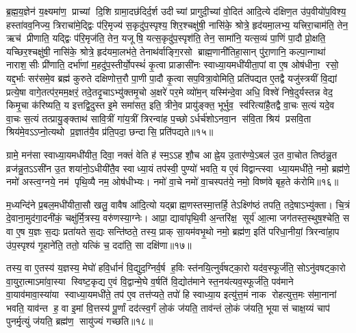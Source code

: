 ब्र॒ह्म॒य॒ज्ञेन॑ य॒क्ष्यमा॑ण॒ प्राच्यां दि॒शि ग्रामा॒दछ॑दिर्द॒र्\mbox{}श उदीच्यां प्रागुदी॒च्यां वो॒दित॑ आदि॒त्ये द॑क्षिण॒त उ॑प॒वीयो॑प॒विश्य॒ हस्ता॑वव॒निज्य॒ त्रिराचा॑मे॒द्द्विः प॑रि॒मृज्य॑ स॒कृदु॑प॒स्पृश्य॒ शिर॒श्चक्षु॑षी॒ नासि॑के॒ श्रोत्रे॒ हृद॑यमा॒लभ्य॒ यत्त्रिरा॒चाम॑ति॒ तेन॒ ऋच॑ प्रीणाति॒ यद्द्विः प॑रि॒मृज॑ति॒ तेन॒ यजूषि॒ यत्स॒कृदु॑प॒स्पृश॑ति॒ तेन॒ सामा॑नि॒ यत्स॒व्यं पा॒णिं पा॒दौ प्रो॒क्षति॒ यच्छिर॒श्चक्षु॑षी॒ नासि॑के॒ श्रोत्रे॒ हृद॑यमा॒लभ॑ते॒ तेनाथ॑र्वाङ्गि॒रसो ब्राह्म॒णानी॑तिहा॒सान् पु॑रा॒णानि॒ कल्पा॒न्गाथा॑ नाराश॒सीः प्री॑णाति॒ दर्भा॑णां म॒हदु॑प॒स्तीर्यो॒पस्थं॑ कृ॒त्वा प्राङासी॑नः स्वाध्या॒यमधी॑यीता॒पां वा ए॒ष ओष॑धीना॒ रसो॒ यद्द॒र्भाः सर॑समे॒व ब्रह्म॑ कुरुते दक्षिणोत्त॒रौ पा॒णी पा॒दौ कृ॒त्वा सप॒वित्रा॒वोमिति॒ प्रति॑पद्यत ए॒तद्वै यजु॑स्त्रयीं वि॒द्यां प्रत्ये॒षा वागे॒तत्प॑र॒मम॒क्षरं॒ तदे॒तदृ॒चाऽभ्यु॑क्तमृ॒चो अ॒क्षरे॑ पर॒मे व्यो॑म॒न् यस्मि॑न्दे॒वा अधि॒ विश्वे॑ निषे॒दुर्यस्तन्न वेद॒ किमृ॒चा क॑रिष्यति॒ य इत्तद्वि॒दुस्त इ॒मे समा॑सत॒ इति॒ त्रीने॒व प्रायु॑ङ्क्त॒ भूर्भुव॒ स्व॑रित्या॑है॒तद्वै वा॒चः स॒त्यं यदे॒व वा॒चः स॒त्यं तत्प्रायु॒ङ्क्ताथ॑ सावि॒त्रीं गा॑य॒त्रीं त्रिरन्वा॑ह प॒च्छोऽर्धर्च॑शोऽनवा॒न स॑वि॒ता श्रिय॑ प्रसवि॒ता श्रिय॑मे॒वऽऽप्नो॒त्यथो प्र॒ज्ञात॑यै॒व प्र॑ति॒पदा॒ छन्दासि॒ प्रति॑पद्यते॥१५॥\anuvakamend


ग्रामे॒ मन॑सा स्वाध्या॒यमधी॑यीत॒ दिवा॒ नक्तं॑ वेति ह॑ स्म॒ऽऽह शौ॒च आह्ने॒य उ॒तार॑ण्ये॒ऽबल॑ उ॒त वा॒चोत तिष्ठ॑न्नु॒त व्रज॑न्नु॒तऽऽसी॑न उ॒त शया॑नो॒ऽधीयी॑तै॒व स्वाध्या॒यं तप॑स्वी॒ पुण्यो॑ भवति॒ य ए॒वं विद्वान्त्स्वाध्या॒यमधी॑ते॒ नमो॒ ब्रह्म॑णे॒ नमो॑ अस्त्व॒ग्नये॒ नम॑ पृथि॒व्यै नम॒ ओष॑धीभ्यः। नमो॑ वा॒चे नमो॑ वा॒चस्पत॑ये॒ नमो॒ विष्ण॑वे बृह॒ते क॑रोमि॥१६॥
\anuvakamend


म॒ध्यन्दि॑ने प्र॒बल॒मधी॑यीता॒सौ खलु॒ वावैष आ॑दि॒त्यो यद्ब्राह्म॒ण\-स्तस्मा॒त्तर्\mbox{}हि॒ तेऽक्ष्णि॑ष्ठं तपति॒ तदे॒षाऽभ्यु॑क्ता। चि॒त्रं दे॒वाना॒मुद॑गा॒\-दनी॑कं॒ चक्षु॑र्मि॒त्रस्य॒ वरु॑णस्या॒ग्नेः। आप्रा॒ द्यावा॑पृथि॒वी अ॒न्तरि॑क्ष॒ सूर्य॑ आ॒त्मा जग॑तस्त॒स्थुष॒श्चेति॒ स वा ए॒ष य॒ज्ञः स॒द्यः प्रता॑यते स॒द्यः सन्ति॑ष्ठते॒ तस्य॒ प्राक् सा॒यम॑वभृ॒थो नमो॒ ब्रह्म॑ण॒ इति॑ परिधा॒नीयां॒ त्रिरन्वा॑हा॒प उ॑प॒स्पृश्य॑ गृ॒हाने॑ति॒ ततो॒ यत्किं च॒ ददा॑ति॒ सा दक्षि॑णा॥१७॥\anuvakamend


तस्य॒ वा ए॒तस्य॑ य॒ज्ञस्य॒ मेघो॑ हवि॒र्धानं॑ वि॒द्युद॒ग्निर्\mbox{}व॒र्\mbox{}ष ह॒विः स्त॑नयि॒त्नुर्व॑षट्का॒रो यद॑व॒स्फूर्ज॑ति॒ सोऽनु॑वषट्का॒रो वा॒युरा॒त्माऽमा॑वा॒स्या स्विष्ट॒कृद्य ए॒वं वि॒द्वान्मे॒घे व॒र्\mbox{}षति॑ वि॒द्योत॑माने स्त॒नय॑त्यव॒स्फूर्ज॑ति॒ पव॑माने वा॒याव॑मावा॒स्या॑या स्वाध्या॒यमधी॑ते॒ तप॑ ए॒व तत्त॑प्यते॒ तपो॑ हि स्वाध्या॒य इत्यु॑त्त॒मं नाक रोहत्युत्त॒मः स॑मा॒नानां भवति॒ याव॑न्त ह॒ वा इ॒मां वि॒त्तस्य॑ पू॒र्णां दद॑त्स्व॒र्गं लो॒कं ज॑यति॒ ताव॑न्तं लो॒कं ज॑यति॒ भूयासं चाक्ष॒य्यं चाप॑ पुनर्मृ॒त्युं ज॑यति॒ ब्रह्म॑ण॒ सायु॑ज्यं गच्छति॥१८॥\anuvakamend


